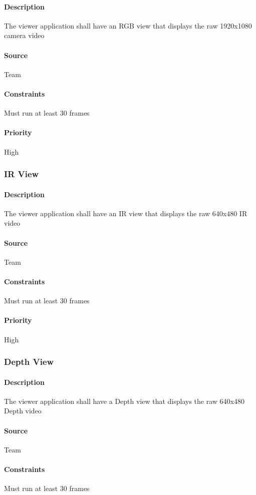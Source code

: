 \paragraph{Description}
The viewer application shall have an RGB view that displays the raw 1920x1080 camera video
\paragraph{Source}
Team
\paragraph{Constraints}
Must run at least 30 frames
\paragraph{Priority}
High
\subsubsection{IR View}
\paragraph{Description}
The viewer application shall have an IR view that displays the raw 640x480 IR video
\paragraph{Source}
Team
\paragraph{Constraints}
Must run at least 30 frames
\paragraph{Priority}
High
\subsubsection{Depth View}
\paragraph{Description}
The viewer application shall have a Depth view that displays the raw 640x480 Depth video
\paragraph{Source}
Team
\paragraph{Constraints}
Must run at least 30 frames
